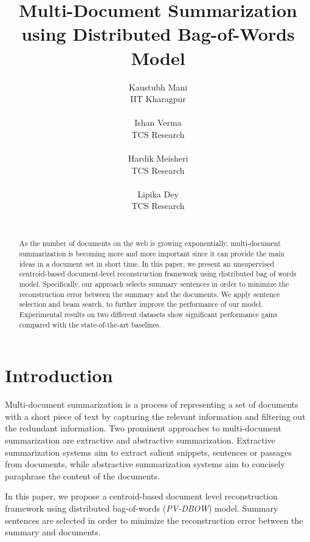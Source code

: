 \documentclass[11pt,a4paper]{article}
\title{Multi-Document Summarization using Distributed Bag-of-Words Model}
\author{Kaustubh Mani \\
  IIT Kharagpur \\
  \\\And
  Ishan Verma \\
  TCS Research \\
   \\\And
  Hardik Meisheri \\
  TCS Research \\
   \\\And
  Lipika Dey \\
  TCS Research \\
  \\}
\date{}
\begin{document}
\maketitle
\begin{abstract}
  As the number of documents on the web is growing exponentially, multi-document summarization is becoming more and more important since it can provide the main ideas in a document set in short time. In this paper, we present an unsupervised centroid-based document-level reconstruction framework using distributed bag of words model. Specifically, our approach selects summary sentences in order to minimize the reconstruction error between the summary and the documents. We apply sentence selection and beam search,  to further improve the performance of our model. Experimental results on two different datasets show significant performance gains compared with the state-of-the-art baselines.
\end{abstract}

\section{Introduction}
Multi-document summarization is a process of representing a set of documents with a short piece of text by capturing the relevant information and filtering out the redundant information. Two prominent approaches to multi-document summarization are extractive and abstractive summarization. Extractive summarization systems aim to extract salient snippets, sentences or passages from documents, while abstractive summarization systems aim to concisely paraphrase the content of the documents.

In this paper, we propose a centroid-based document level reconstruction framework using distributed bag-of-words (\textit{PV-DBOW}) \cite{pv} model. Summary sentences are selected in order to minimize the reconstruction error between the summary and documents. 

\end{document}
